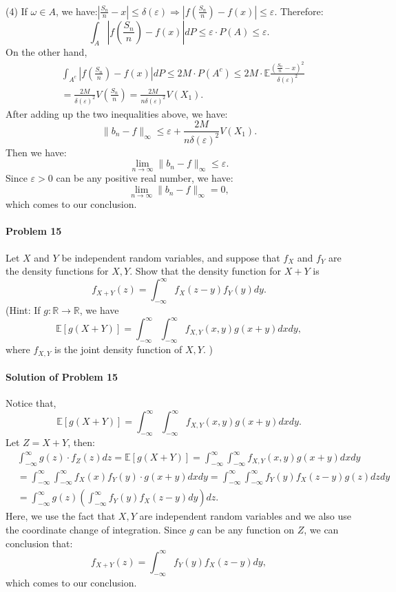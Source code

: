 \documentclass{article}
\begin{document}
~\\
(4) If $\omega\in A$, we have:$|\frac{S_n}{n}-x|\leqslant \delta(\varepsilon)\Rightarrow \left|f\left(\frac{S_n}{n}\right)-f(x)\right|\leqslant \varepsilon$. Therefore:
\[\int_A\left|f\left(\frac{S_n}{n}\right)-f(x)\right|dP\leqslant \varepsilon\cdot P(A)\leqslant \varepsilon.\]
On the other hand,
\begin{equation*}
\begin{aligned}
&\int_{A^c}\left|f\left(\frac{S_n}{n}\right)-f(x)\right|dP \leqslant 2M\cdot P(A^c)\leqslant 2M\cdot\mathbb{E}\frac{\left(\frac{S_n}{n}-x\right)^2}{\delta(\varepsilon)^2}\\
&=\frac{2M}{\delta(\varepsilon)^2}V\left(\frac{S_n}{n}\right)=\frac{2M}{n\delta(\varepsilon)^2}V(X_1).
\end{aligned}    
\end{equation*}
After adding up the two inequalities above, we have:
\[\|b_n-f\|_{\infty}\leqslant \varepsilon+\frac{2M}{n\delta(\varepsilon)^2}V(X_1).\]
Then we have:
\[\lim_{n\rightarrow\infty}\|b_n-f\|_{\infty}\leqslant \varepsilon.\] 
Since $\varepsilon > 0$ can be any positive real number, we have:
\[\lim_{n\rightarrow\infty}\|b_n-f\|_{\infty} = 0,\]
which comes to our conclusion. 

\paragraph{Problem 15} Let $X$ and $Y$ be independent random variables, and suppose that $f_X$ and $f_Y$ are the density functions for $X, Y$. Show that the density function for $X+Y$ is 
\[f_{X+Y}(z)=\int_{-\infty}^{\infty} f_X(z-y)f_Y(y)dy.\]
(Hint: If $g:\mathbb{R}\rightarrow\mathbb{R}$, we have
\[\mathbb{E}[g(X+Y)]=\int_{-\infty}^{\infty}\int_{-\infty}^{\infty}f_{X,Y}(x,y)g(x+y)dxdy,\]
where $f_{X,Y}$ is the joint density function of $X,Y$. )

\paragraph{Solution of Problem 15} Notice that, 
\[\mathbb{E}[g(X+Y)]=\int_{-\infty}^{\infty}\int_{-\infty}^{\infty}f_{X,Y}(x,y)g(x+y)dxdy.\]
Let $Z=X+Y$, then:
\begin{equation*}
\begin{aligned}
&\int_{-\infty}^{\infty} g(z)\cdot f_Z(z)dz = \mathbb{E}[g(X+Y)] = \int_{-\infty}^{\infty}\int_{-\infty}^{\infty}f_{X,Y}(x,y)g(x+y)dxdy\\
&= \int_{-\infty}^{\infty}\int_{-\infty}^{\infty}f_X(x) f_Y(y)\cdot g(x+y)dxdy = \int_{-\infty}^{\infty}\int_{-\infty}^{\infty} f_Y(y)f_X(z-y) g(z) dzdy\\
&= \int_{-\infty}^{\infty}g(z)\left(\int_{-\infty}^{\infty}f_Y(y)f_X(z-y)dy\right)dz.
\end{aligned}    
\end{equation*}
Here, we use the fact that $X,Y$ are independent random variables and we also use the coordinate change of integration. Since $g$ can be any function on $Z$, we can conclusion that:
\[f_{X+Y}(z) = \int_{-\infty}^{\infty}f_Y(y)f_X(z-y)dy,\]
which comes to our conclusion. 
\end{document}
